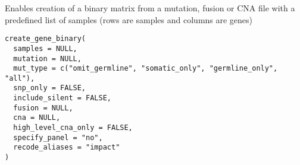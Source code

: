 \documentclass[a4paper]{book}
\begin{document}
%
\begin{Description}\relax
Enables creation of a binary matrix from a mutation, fusion or CNA file with
a predefined list of samples (rows are samples and columns are genes)
\end{Description}
%
\begin{Usage}
\begin{verbatim}
create_gene_binary(
  samples = NULL,
  mutation = NULL,
  mut_type = c("omit_germline", "somatic_only", "germline_only", "all"),
  snp_only = FALSE,
  include_silent = FALSE,
  fusion = NULL,
  cna = NULL,
  high_level_cna_only = FALSE,
  specify_panel = "no",
  recode_aliases = "impact"
)
\end{verbatim}
\end{Usage}
%
\end{document}
